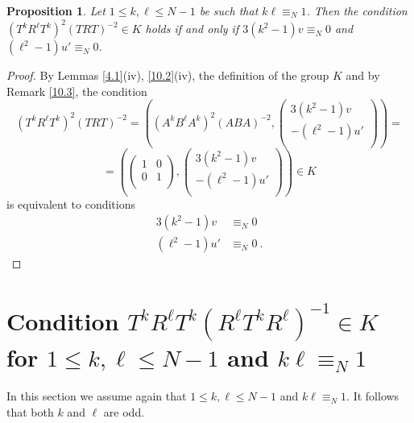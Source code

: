 \documentclass[10pt]{amsart}
\theoremstyle{plain}
\newtheorem{proposition}[theorem]{Proposition}
\theoremstyle{definition}
\theoremstyle{remark}%
\newcommand{\mat}[4]{\left(\begin{array}{cc}
 #1 & #2\\
 #3 & #4\\
\end{array}\right)}
\newcommand{\vc}[2]{\left(\begin{array}{c}
 #1 \\
 #2\\
\end{array}\right)}
\begin{document}
\begin{proposition}\label{4.3}
 Let $1\leq k,\ell\leq N-1$ be  such that $k\ell\equiv_N 1$. Then the condition $(T^k R^{\ell}T^k)^2(TRT)^{-2}\in K$  holds if and only if  $3(k^2-1)v\equiv_N 0$ and 
$(\ell^2-1)u'\equiv_N 0$.
\end{proposition}
\begin{proof}
By Lemmas \ref{4.1}(iv), \ref{10.2}(iv), the definition of the group $K$ and by  Remark \ref{10.3}, the condition
$$\left(T^k R^\ell T^k\right)^{2}\left(TRT\right)^{-2}=\left((A^k B^{\ell}A^k)^2(A BA)^{-2}, \vc{3(k^2-1)v}{-(\ell^2-1)u'}\right)=$$
$$=\left(\mat{1}{0}{0}{1},\vc{3(k^2-1)v}{-(\ell^2-1)u'}\right)\in K$$
is equivalent to conditions
\begin{align*}
3(k^2-1)v&\equiv_N 0 \\
(\ell^2-1)u'&\equiv_N 0\ .
\end{align*}
\end{proof}









\section{Condition $T^k R^{\ell}T^k(R^{\ell}T^k R^{\ell})^{-1}\in K$ for $1\leq k,\ell\leq N-1$ and $k\ell\equiv_N 1$}\label{section_11}




In this section we assume again that $1\leq k,\ell\leq N-1$ and $k\ell\equiv_N 1$. It follows that both $k$ and $\ell$ are odd.
\end{document}
